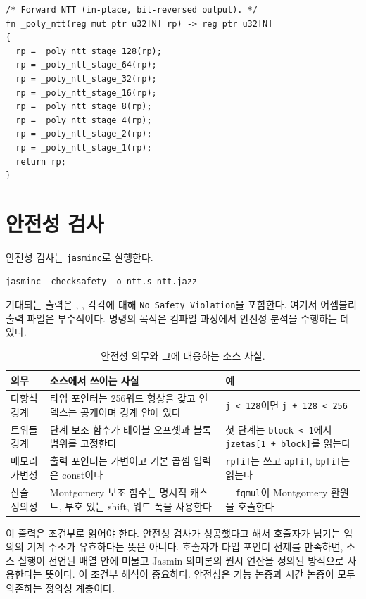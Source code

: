 \documentclass[10pt,twocolumn]{article}
\newcommand{\jasmin}{Jasmin}
\begin{document}
\begin{lstlisting}[language=Jasmin,caption={내부 함수.},label={lst:ko-wrapper}]
/* Forward NTT (in-place, bit-reversed output). */
fn _poly_ntt(reg mut ptr u32[N] rp) -> reg ptr u32[N]
{
  rp = _poly_ntt_stage_128(rp);
  rp = _poly_ntt_stage_64(rp);
  rp = _poly_ntt_stage_32(rp);
  rp = _poly_ntt_stage_16(rp);
  rp = _poly_ntt_stage_8(rp);
  rp = _poly_ntt_stage_4(rp);
  rp = _poly_ntt_stage_2(rp);
  rp = _poly_ntt_stage_1(rp);
  return rp;
}
\end{lstlisting}

\section{안전성 검사}

안전성 검사는 \texttt{jasminc}로 실행한다.

\begin{lstlisting}[language=Shell,caption={안전성 검사 명령.},label={lst:ko-safetycmd}]
jasminc -checksafety -o ntt.s ntt.jazz
\end{lstlisting}

기대되는 출력은 , ,
 각각에 대해 \texttt{No Safety Violation}을
포함한다. 여기서 어셈블리 출력 파일은 부수적이다. 명령의 목적은
컴파일 과정에서 안전성 분석을 수행하는 데 있다.

\begin{table}[t]
\centering
\scriptsize
\setlength{\tabcolsep}{3pt}
\begin{tabular}{P{0.28\columnwidth}P{0.35\columnwidth}P{0.27\columnwidth}}
\toprule
의무 & 소스에서 쓰이는 사실 & 예 \tabularnewline
\midrule
다항식 경계 & 타입 포인터는 256워드 형상을 갖고 인덱스는 공개이며
경계 안에 있다 & \texttt{j < 128}이면 \texttt{j + 128 < 256} \tabularnewline
트위들 경계 & 단계 보조 함수가 테이블 오프셋과 블록 범위를 고정한다 &
첫 단계는 \texttt{block < 1}에서 \texttt{jzetas[1 + block]}를 읽는다
\tabularnewline
메모리 가변성 & 출력 포인터는 가변이고 기본 곱셈 입력은 const이다 &
\texttt{rp[i]}는 쓰고 \texttt{ap[i]}, \texttt{bp[i]}는 읽는다 \tabularnewline
산술 정의성 & Montgomery 보조 함수는 명시적 캐스트, 부호 있는 shift,
워드 폭을 사용한다 & \texttt{\_\_fqmul}이 Montgomery 환원을 호출한다
\tabularnewline
\bottomrule
\end{tabular}
\caption{안전성 의무와 그에 대응하는 소스 사실.}
\label{tab:ko-safety}
\end{table}

이 출력은 조건부로 읽어야 한다. 안전성 검사가 성공했다고 해서 호출자가
넘기는 임의의 기계 주소가 유효하다는 뜻은 아니다. 호출자가 타입 포인터
전제를 만족하면, 소스 실행이 선언된 배열 안에 머물고 \jasmin{} 의미론의
원시 연산을 정의된 방식으로 사용한다는 뜻이다. 이 조건부 해석이 중요하다.
안전성은 기능 논증과 시간 논증이 모두 의존하는 정의성 계층이다.
\end{document}

